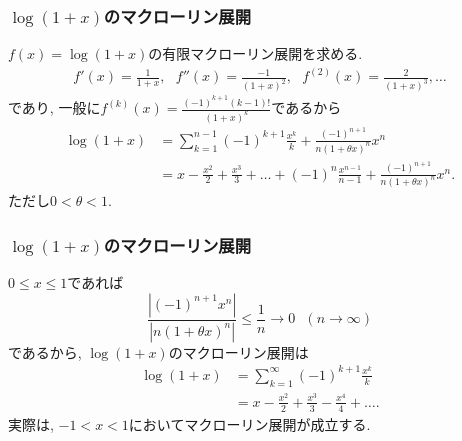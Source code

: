 


\begin{frame}
\frametitle{$\log(1+x)$のマクローリン展開}

$f(x)=\log(1+x)$の有限マクローリン展開を求める. 
\begin{align*}
f'(x)=\frac{1}{1+x}, \ \ \  f''(x)=\frac{-1}{(1+x)^2}, \ \ \  f^{(2)}(x)=\frac{2}{(1+x)^3}, \dots
\end{align*}
であり, 一般に$f^{(k)}(x)=\frac{(-1)^{k+1}(k-1)!}{(1+x)^{k}}$であるから
\begin{align*}
\log(1+x) &= \sum_{k=1}^{n-1}(-1)^{k+1}\frac{x^k}{k}+\frac{(-1)^{n+1}}{n(1+\theta x)^{n}}x^n \\
& = x-\frac{x^2}{2}+\frac{x^3}{3}+ \dots +(-1)^{n}\frac{x^{n-1}}{n-1}+\frac{(-1)^{n+1}}{n(1+\theta x)^{n}}x^n. 
\end{align*}
ただし$0<\theta < 1$. 

\end{frame}






\begin{frame}
\frametitle{$\log(1+x)$のマクローリン展開}

$0\le x\le 1$であれば
$$
\frac{|(-1)^{n+1}x^n|}{|n(1+\theta x)^{n}|} \le \frac{1}{n} \to 0 \ \ \ (n\to \infty)
$$
であるから, $\log(1+x)$のマクローリン展開は
\begin{align*}
\log(1+x) & =  \sum_{k=1}^{\infty}(-1)^{k+1}\frac{x^k}{k} \\
& =  x-\frac{x^2}{2}+\frac{x^3}{3} - \frac{x^4}{4}+\dots.
\end{align*}
実際は, $-1<x<1$においてマクローリン展開が成立する. 

\end{frame}









